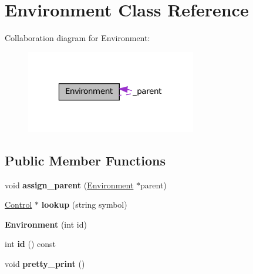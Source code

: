 \hypertarget{classEnvironment}{
\section{Environment Class Reference}
\label{classEnvironment}
}


Collaboration diagram for Environment:\nopagebreak
\begin{figure}[H]
\begin{center}
\leavevmode
\includegraphics[width=211pt]{classEnvironment__coll__graph}
\end{center}
\end{figure}
\subsection*{Public Member Functions}
\begin{DoxyCompactItemize}
\item 
\hypertarget{classEnvironment_a6222137be37777f9a9b101cd0f4742ec}{
void {\bfseries assign\_\-parent} (\hyperlink{classEnvironment}{Environment} $\ast$parent)}
\label{classEnvironment_a6222137be37777f9a9b101cd0f4742ec}

\item 
\hypertarget{classEnvironment_a340ef027cc02e3f17859f236086a1bfd}{
\hyperlink{classControl}{Control} $\ast$ {\bfseries lookup} (string symbol)}
\label{classEnvironment_a340ef027cc02e3f17859f236086a1bfd}

\item 
\hypertarget{classEnvironment_a870868346d63e873806b347e0b6619b9}{
{\bfseries Environment} (int id)}
\label{classEnvironment_a870868346d63e873806b347e0b6619b9}

\item 
\hypertarget{classEnvironment_a38a3ee60ad7bc5f4e8829a5f6b301000}{
int {\bfseries id} () const }
\label{classEnvironment_a38a3ee60ad7bc5f4e8829a5f6b301000}

\item 
\hypertarget{classEnvironment_a4e5d19483e7d71196b8a798f18e4146d}{
void {\bfseries pretty\_\-print} ()}
\label{classEnvironment_a4e5d19483e7d71196b8a798f18e4146d}

\end{DoxyCompactItemize}
